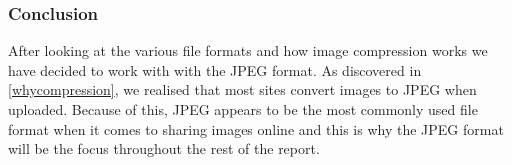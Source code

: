 \subsubsection*{Conclusion}
After looking at the various file formats and how image compression works we have decided to work with with the JPEG format. 
As discovered in \ref{whycompression}, we realised that most sites convert images to JPEG when uploaded. 
Because of this, JPEG appears to be the most commonly used file format when it comes to sharing images online and this is why the JPEG format will be the focus throughout the rest of the report.

